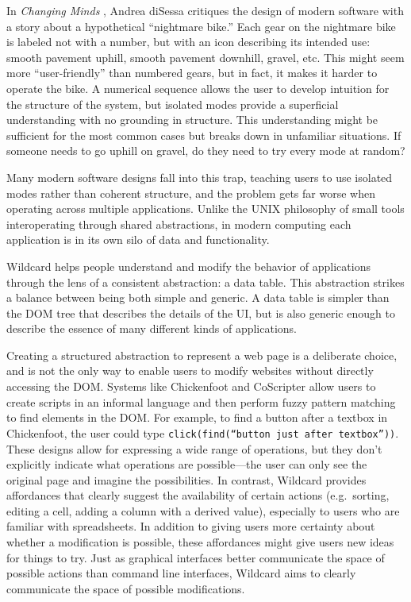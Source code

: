 \documentclass[english,submission]{programming}
\begin{document}
In \emph{Changing Minds} \autocite{disessa2000}, Andrea diSessa
critiques the design of modern software with a story about a
hypothetical ``nightmare bike.'' Each gear on the nightmare bike is
labeled not with a number, but with an icon describing its intended use:
smooth pavement uphill, smooth pavement downhill, gravel, etc. This
might seem more ``user-friendly'' than numbered gears, but in fact, it
makes it harder to operate the bike. A numerical sequence allows the
user to develop intuition for the structure of the system, but isolated
modes provide a superficial understanding with no grounding in
structure. This understanding might be sufficient for the most common
cases but breaks down in unfamiliar situations. If someone needs to go
uphill on gravel, do they need to try every mode at random?

Many modern software designs fall into this trap, teaching users to use
isolated modes rather than coherent structure, and the problem gets far
worse when operating across multiple applications. Unlike the UNIX
philosophy of small tools interoperating through shared abstractions, in
modern computing each application is in its own silo of data and
functionality.

Wildcard helps people understand and modify the behavior of applications
through the lens of a consistent abstraction: a data table. This
abstraction strikes a balance between being both simple and generic. A
data table is simpler than the DOM tree that describes the details of
the UI, but is also generic enough to describe the essence of many
different kinds of applications.

Creating a structured abstraction to represent a web page is a
deliberate choice, and is not the only way to enable users to modify
websites without directly accessing the DOM. Systems like Chickenfoot
\autocite{bolin2005} and CoScripter \autocite{leshed2008} allow users to
create scripts in an informal language and then perform fuzzy pattern
matching to find elements in the DOM. For example, to find a button
after a textbox in Chickenfoot, the user could type
\texttt{click(find(“button\ just\ after\ textbox”))}. These designs
allow for expressing a wide range of operations, but they don't
explicitly indicate what operations are possible---the user can only see
the original page and imagine the possibilities. In contrast, Wildcard
provides affordances that clearly suggest the availability of certain
actions (e.g.~sorting, editing a cell, adding a column with a derived
value), especially to users who are familiar with spreadsheets. In
addition to giving users more certainty about whether a modification is
possible, these affordances might give users new ideas for things to
try. Just as graphical interfaces better communicate the space of
possible actions than command line interfaces, Wildcard aims to clearly
communicate the space of possible modifications.
\end{document}
